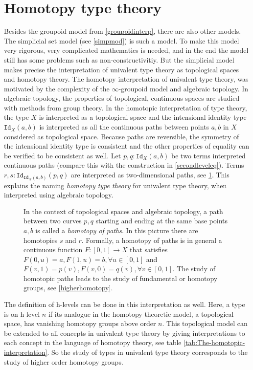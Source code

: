 \documentclass[12pt,a4paper,twoside,xetex]{book} %
\newcommand{\keyword}[1]{\emph{#1}\index{#1}}
\newcommand{\op}[1]{\mathtt{#1}}
\begin{document}
\section{Homotopy type theory}\label{homotopicinterp}

Besides the groupoid model from \cref{groupoidinterp}, there are also other 
models. The simplicial set model (see \cref{simpmod}) is such a model. To make this model very rigorous, very complicated mathematics is needed, and in the end the model still has some problems such as non-constructivitiy. But the simplicial model makes precise the interpretation of univalent type theory as topological spaces and homotopy theory. The homotopy interpretation of univalent type theory, 
was motivated by the complexity of the $\infty$-groupoid model and algebraic 
topology. In algebraic topology, the properties of topological, continuous 
spaces are studied with methods from group theory. In the homotopic 
interpretation of type theory, the type $X$ is interpreted as a topological 
space and the intensional identity type $\op{Id}_X(a,b)$ is interpreted as all 
the continuous paths between points $a,b$ in $X$ considered as topological 
space. Because paths are reversible, the symmetry of the intensional identity 
type is consistent and the other properties of equality can be verified to be 
consistent as well. Let $p,q: \op{Id}_X(a,b)$ be two terms interpreted 
continuous paths (compare this with the construction in \cref{secondleveleq}). 
Terms $r,s:\op{Id}_{\op{Id}_X(a,b)}(p,q)$ are interpreted as two-dimensional 
paths, see \cref{simplehomotopy}. This explains the naming \keyword{homotopy 
type theory} for univalent type theory, when interpreted using algebraic 
topology. 

\begin{figure}\label{simplehomotopy}
\centering

\caption{In the context of topological spaces and algebraic topology, a path 
between two curves $p,q$ starting and ending at the same base points $a,b$ is 
called a \keyword{homotopy of paths}. In this picture there are homotopies $s$ 
and $r$. Formally, a homotopy of paths is in general a continuous function $F: 
[0,1] \rightarrow  X$ that satisfies $F(0,u) = a, F(1,u)=b, \forall u \in 
[0,1]$ and $F(v,1)=p(v), F(v,0)=q(v), \forall v \in [0,1]$. The study of 
homotopic paths leads to the study of fundamental or homotopy groups, see 
\cref{higherhomotopy}. }
\end{figure}

The definition of h-levels can be done in this interpretation as well. Here, a 
type is on h-level $n$ if its analogue in the homotopy theoretic model, a 
topological space, has vanishing homotopy groups above order $n$. This 
topological model can be extended to all concepts in univalent type theory by 
giving interpretations to each concept in the language of homotopy theory, see 
table \cref{tab:The-homotopic-interpretation}. So the study of types in 
univalent type theory corresponds to the study of higher order homotopy groups.
\end{document}
